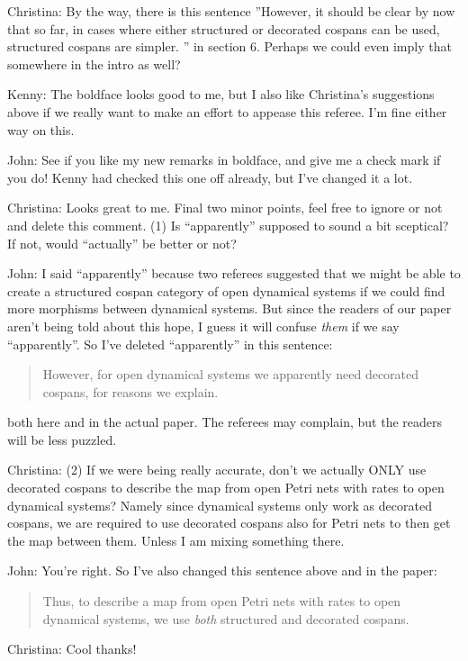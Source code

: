 \documentclass[reqno]{amsart}
\def\chris{\color{purple} Christina: }
\def\john{\color{red} John: }
\def\kenny{\color{blue} Kenny: }
\begin{document}
\begin{enumerate}
{\chris By the way, there is this sentence ''However, it should be clear by now that so
far, in cases where either structured or decorated cospans can be used, structured cospans are simpler. '' in section 6. Perhaps we could even imply 
that somewhere in the intro as well?}

{\kenny The boldface looks good to me, but I also like Christina's suggestions above if we really want to make an effort to appease this referee. I'm fine either way on this.}


{\john See if you like my new remarks in boldface, and give me a check mark if you do!  Kenny had checked this one off already, but I've changed it a 
lot.}

{\chris Looks great to me. Final two minor points, feel free to ignore or not and delete this comment. (1) Is ``apparently'' supposed to sound a bit 
sceptical? If not, would ``actually'' be better or not?}

{\john I said ``apparently'' because two referees suggested that we might be able to create a structured cospan category of open dynamical systems if we could find more morphisms between dynamical systems.  But since the readers of our paper aren't being told about this hope, I guess it will confuse \emph{them} if we say ``apparently''.   So I've deleted ``apparently'' in this sentence: 

\begin{quote}
However, for open dynamical systems we apparently need decorated cospans, for reasons we explain. 
\end{quote}
\noindent
both here and in the actual paper.  The referees may complain, but the readers will be less puzzled.}

{\chris (2) If we were being really accurate, don't we 
actually ONLY use decorated cospans to describe the map from open Petri nets with rates to open dynamical systems? Namely since dynamical systems only 
work as decorated cospans, we are required to use decorated cospans also for Petri nets to then get the map between them. Unless I am mixing something 
there.}

{\john You're right.  So I've also changed this sentence above and in the paper:

\begin{quote}
Thus, to describe a map from open Petri nets with rates to open dynamical systems, we use \emph{both} structured and decorated cospans.
\end{quote}}

{\chris Cool thanks!}


\end{enumerate}
\end{document}
